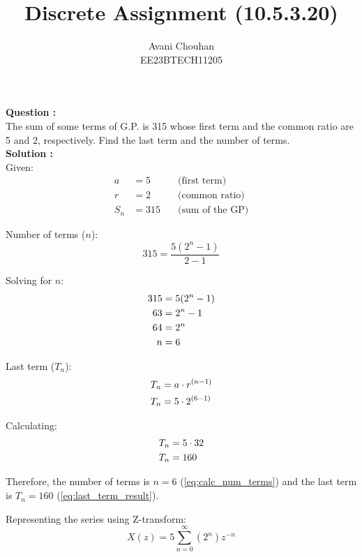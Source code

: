\documentclass[twocolumn]{article}
\begin{document}
\title{Discrete Assignment (10.5.3.20)}
\author{Avani Chouhan \\
        EE23BTECH11205}
\maketitle

\textbf{Question : }\\
The sum of some terms of G.P. is 315 whose first term and the common ratio are 5 and 2, respectively. Find the last term and the number of terms.\\
\textbf{Solution : }\\
Given:
\begin{align}
a &= 5 \label{eq:first_term} \quad &\text{(first term)} \\
r &= 2 \label{eq:common_ratio} \quad &\text{(common ratio)} \\
S_n &= 315 \label{eq:sum_GP} \quad &\text{(sum of the GP)}
\end{align}

Number of terms (\(n\)):
\begin{equation}
315 = \frac{5(2^n - 1)}{2 - 1} \label{eq:num_terms}
\end{equation}

Solving for \(n\):
\begin{align}
315 &= 5(2^n - 1) \notag \\
63 &= 2^n - 1 \notag \\
64 &= 2^n \notag \\
n &= 6 \label{eq:calc_num_terms}
\end{align}

Last term (\(T_n\)):
\begin{align}
T_n &= a \cdot r^{(n-1)} \notag \\
T_n &= 5 \cdot 2^{(6-1)} \label{eq:last_term_calc}
\end{align}

Calculating:
\begin{align}
T_n &= 5 \cdot 32 \notag \\
T_n &= 160 \label{eq:last_term_result}
\end{align}

Therefore, the number of terms is \(n = 6\) (\ref{eq:calc_num_terms}) and the last term is \(T_n = 160\) (\ref{eq:last_term_result}).

Representing the series using Z-transform:
\begin{equation}
X(z) = 5 \sum_{n=0}^{\infty} (2^n)z^{-n} \label{eq:z_transform_series}
\end{equation}
\end{document}
